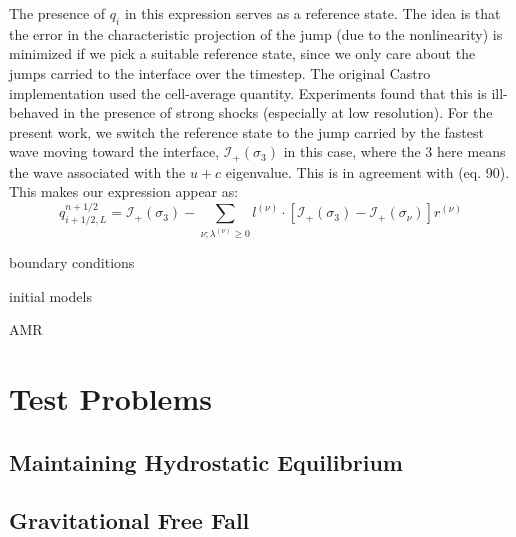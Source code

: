 \documentclass[12pt,preprint]{aastex}
\begin{document}
The presence of $q_i$ in this expression serves as a reference state.
The idea is that the error in the characteristic projection of the
jump (due to the nonlinearity) is minimized if we pick a suitable
reference state, since we only care about the jumps carried to the
interface over the timestep.  The original Castro implementation used
the cell-average quantity.  Experiments found that this is ill-behaved
in the presence of strong shocks (especially at low resolution). For
the present work, we switch the reference state to the jump carried by the 
fastest wave moving toward the interface, $\mathcal{I}_+(\sigma_3)$ in this
case, where the $3$ here means the wave associated with the $u + c$ eigenvalue.
This is in agreement with \citet{ppmunsplit} (eq. 90).  This makes our
expression appear as:
\begin{equation}
q_{i+1/2,L}^{n+1/2} = \mathcal{I}_+(\sigma_3) -
   \sum_{\nu;\lambda^{(\nu)}\ge 0} l^{(\nu)} \cdot \left [
        \mathcal{I}_+(\sigma_3)  - \mathcal{I}_+(\sigma_\nu)
       \right ] r^{(\nu)}
\end{equation}




boundary conditions

initial models

AMR


\section{Test Problems}\label{Sec:Tests}

\subsection{Maintaining Hydrostatic Equilibrium}\label{Sec:HSE}

\subsection{Gravitational Free Fall}\label{Sec:Gravitational Free Fall}
\end{document}
